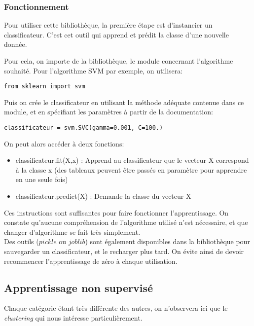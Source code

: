 \subsubsection{Fonctionnement}

Pour utiliser cette bibliothèque, la première étape est d'instancier un classificateur. C'est cet outil qui apprend et prédit la classe d'une nouvelle donnée.

Pour cela, on importe de la bibliothèque, le module concernant l'algorithme souhaité. Pour l'algorithme SVM par exemple, on utilisera:
\begin{Verbatim}
from sklearn import svm
\end{Verbatim}
Puis on crée le classificateur en utilisant la méthode adéquate contenue dans ce module, et en spécifiant les paramètres à partir de la documentation:
\begin{Verbatim}
classificateur = svm.SVC(gamma=0.001, C=100.)
\end{Verbatim}

On peut alors accéder à deux fonctions:
\begin{itemize}
\item classificateur.fit(X,x) : Apprend au classificateur que le vecteur X correspond à la classe x (des tableaux peuvent être passés en paramètre pour apprendre en une seule fois)
\item classificateur.predict(X) : Demande la classe du vecteur X\\
\end{itemize}

Ces instructions sont suffisantes pour faire fonctionner l'apprentissage. On constate qu'aucune compréhension de l'algorithme utilisé n'est nécessaire, et que changer d'algorithme se fait très simplement.\\

Des outils ($pickle$ ou $joblib$) sont également disponibles dans la bibliothèque pour sauvegarder un classificateur, et le recharger plus tard. On évite ainsi de devoir recommencer l'apprentissage de zéro à chaque utilisation.

\subsection{Apprentissage non supervisé}

Chaque catégorie étant très différente des autres, on n'observera ici que le \textit{clustering} qui nous intéresse particulièrement.

